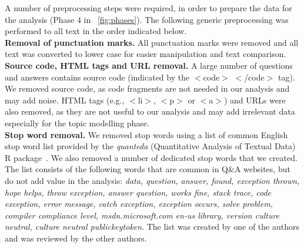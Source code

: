 \documentclass{elsarticle}
\begin{document}
A number of preprocessing steps were required, in order to prepare the data for the analysis (Phase 4 in \figurename~\ref{fig:phases}). The following generic preprocessing was performed to all text in the order indicated below.\\
\textbf{Removal of punctuation marks.} All punctuation marks were removed and all text was converted to lower case for easier manipulation and text comparison. \\
\textbf{Source code, HTML tags and URL removal.} A large number of questions and answers contains source code (indicated by the $<$code$>$ $<$/code$>$ tag). We removed source code, as code fragments are not needed in our analysis and may add noise. HTML tags (e.g., $<$li$>$, $<$p$>$ or $<$a$>$) and URLs were also removed, as they are not useful to our analysis and may add irrelevant data especially for the topic modelling phase.\\
\textbf{Stop word removal.} We removed stop words using a list of common English stop word list provided by the \emph{quanteda} (Quantitative Analysis of Textual Data) R package~\cite{benoit2018quanteda}. We also removed a number of dedicated stop words that we created. The list consists of the following words that are common in Q\&A websites, but do not add value in the analysis: \emph{data, question, answer, found, exception thrown, hope helps, throw exception, answer question, works fine, stack trace, code exception, error message, catch exception, exception occurs, solve problem, compiler compliance level, msdn.microsoft.com en-us library, version culture neutral, culture neutral publickeytoken}. The list was created by one of the authors and was reviewed by the other authors. 
\end{document}
